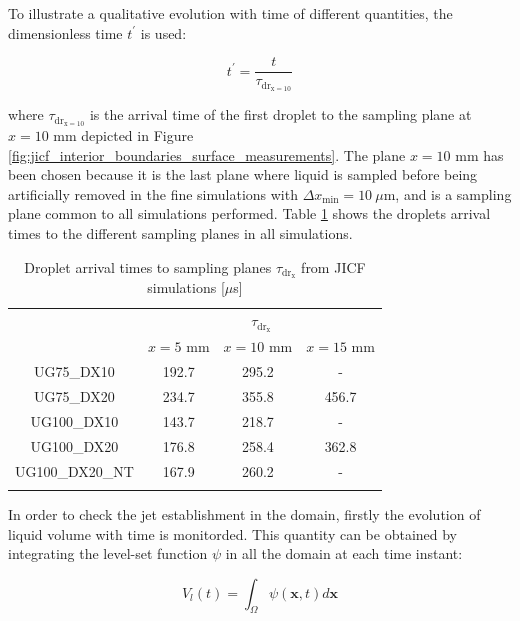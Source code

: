 To illustrate a qualitative evolution with time of different quantities, the dimensionless time $t^{\prime} $ is used:

\begin{equation}
\label{eq:t_prime_with_tau_drx10}
t^{\prime} = \frac{t}{\tau_\mathrm{dr_{x=10}}}
\end{equation}

where $\tau_\mathrm{dr_{x=10}}$ is the arrival time of the first droplet to the sampling plane at $x = 10$ mm depicted in Figure \ref{fig:jicf_interior_boundaries_surface_measurements}. The plane $x = 10$ mm has been chosen because it is the last plane where liquid is sampled before being artificially removed in the fine simulations with $\Delta x_\mathrm{min} = 10 ~\mu$m, and is a sampling plane common to all simulations performed. Table \ref{tab:jicf_characteristic_droplet_sampling_times} shows the droplets arrival times to the different sampling planes in all simulations. 

\begin{table}[!h]
\centering
\caption{Droplet arrival times to sampling planes $\tau_\mathrm{dr_x}$ from JICF simulations [$\mu$s]}
\begin{tabular}{cccc}
\thickhline
\multirow{2}{*}{ \textbf{Case}} &  \multicolumn{3}{c}{$\tau_\mathrm{dr_x}$} \\
\cline{2-4}
 & $x = 5$ mm & $x = 10$ mm & $x = 15$ mm  \\
\thickhline 
UG75\_DX10  & 192.7 & 295.2 & -  \\
UG75\_DX20  & 234.7 & 355.8 & 456.7 \\
UG100\_DX10 & 143.7 & 218.7 & - \\
UG100\_DX20 & 176.8 & 258.4 & 362.8 \\
UG100\_DX20\_NT & 167.9 & 260.2 & - \\
\thickhline
\end{tabular}
\label{tab:jicf_characteristic_droplet_sampling_times}
\end{table}
In order to check the jet establishment in the domain, firstly the evolution of liquid volume with time is monitorded. This quantity can be obtained by integrating the level-set function $\psi$ in all the domain at each time instant:

\begin{equation}
\label{eq:liquid_volume_from_levelset_definition}
V_l \left ( t \right) = \int_{\Omega} \psi \left( \textbf{x}, t \right) d\textbf{x}
\end{equation}

